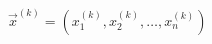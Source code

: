 \documentclass[A4,11pt]{article}
\begin{document}
\thispagestyle{empty}
$\vec{x}^{(k)}=\left(x_1^{(k)}, x_2^{(k)}, \dots, x_n^{(k)}\right)$
\end{document}
